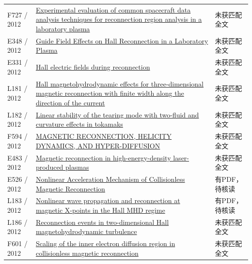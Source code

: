 \documentclass[UTF8,a4paper,11pt,openany,fontset=fandol]{ctexbook}
\begin{document}
\begin{longtable}{P{24mm}P{97mm}P{27mm}}
F727 / 2012 & \href{https://doi.org/10.1029/2012ja017742}{Experimental evaluation of common spacecraft data analysis techniques for reconnection region analysis in a laboratory plasma} & 未获匹配全文\\

E348 / 2012 & \href{http://absimage.aps.org/image/DPP12/MWS_DPP12-2012-000125.pdf}{Guide Field Effects on Hall Reconnection in a Laboratory Plasma} & 未获匹配全文\\

E331 / 2012 & \href{https://ui.adsabs.harvard.edu/abs/2012cosp...39..641G/abstract}{Hall electric fields during reconnection} & 未获匹配全文\\

L181 / 2012 & \href{https://doi.org/10.1029/2011ja017006}{Hall magnetohydrodynamic effects for three‐dimensional magnetic reconnection with finite width along the direction of the current} & 未获匹配全文\\

L182 / 2012 & \href{https://doi.org/10.1063/1.4754000}{Linear stability of the tearing mode with two-fluid and curvature effects in tokamaks} & 未获匹配全文\\

F594 / 2012 & \href{https://doi.org/10.1088/0004-637x/757/2/173}{MAGNETIC RECONNECTION,  HELICITY DYNAMICS,  AND HYPER-DIFFUSION} & 未获匹配全文\\

E483 / 2012 & \href{https://doi.org/10.1063/1.3694119}{Magnetic reconnection in high-energy-density laser-produced plasmas} & 未获匹配全文\\

E526 / 2012 & \href{https://doi.org/10.48550/arxiv.1210.0630}{Nonlinear Acceleration Mechanism of Collisionless Magnetic Reconnection} & 有PDF，待核读\\

L183 / 2012 & \href{https://doi.org/10.1051/0004-6361/201219098}{Nonlinear wave propagation and reconnection at magnetic X-points in the Hall MHD regime} & 有PDF，待核读\\

L186 / 2012 & \href{https://doi.org/10.1063/1.4754151}{Reconnection events in two-dimensional Hall magnetohydrodynamic turbulence} & 未获匹配全文\\

F601 / 2012 & \href{https://doi.org/10.1029/2011ja017464}{Scaling of the inner electron diffusion region in collisionless magnetic reconnection} & 未获匹配全文\\


\end{longtable}
\end{document}
